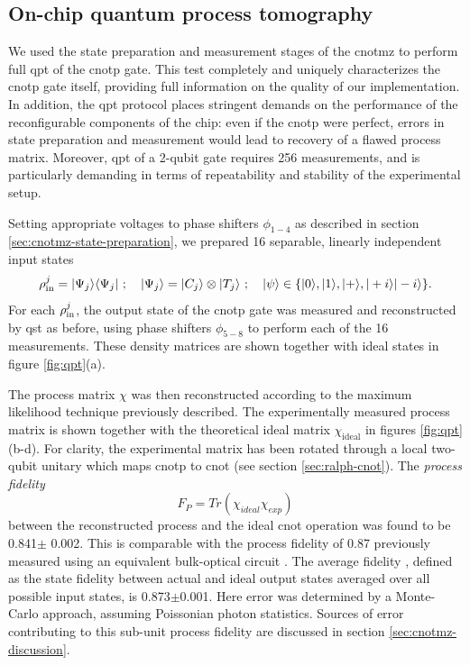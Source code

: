 \subsection{On-chip quantum process tomography}
\label{sec:expt-process-tomo}
We used the state preparation and measurement stages of the \gls{cnotmz} to perform full \gls{qpt} of the \gls{cnotp} gate. This test completely and uniquely characterizes the \gls{cnotp} gate itself, providing full information on the quality of our implementation. In addition, the \gls{qpt} protocol places stringent demands on the performance of the reconfigurable components of the chip: even if the \gls{cnotp} were perfect, errors in state preparation and measurement would lead to recovery of a flawed process matrix. Moreover, \gls{qpt} of a 2-qubit gate requires 256 measurements, and is particularly demanding in terms of repeatability and stability of the experimental setup.

Setting appropriate voltages to phase shifters $\phi_{1-4}$ as described in section \ref{sec:cnotmz-state-preparation}, we prepared 16 separable, linearly independent input states 
\begin{equation}
\rho^j_{\mathrm{in}} = \mbox{$ | \Psi_j \rangle $}{\mbox{$ \langle \Psi_j | $}}~ ; \quad
\mbox{$ | \Psi_j \rangle $}=\mbox{$ | C_j \rangle $}\otimes \mbox{$ | T_j \rangle $}~ ; \quad
\mbox{$ | \psi \rangle $} \in \{\mbox{$ | 0 \rangle $}, \mbox{$ | 1 \rangle $}, \mbox{$ | + \rangle $}, \mbox{$ | +i \rangle $} \mbox{$ | -i \rangle $} \}.
\end{equation}
For each $\rho^j_{\mathrm{in}}$, the output state of the \acrshort{cnotp} gate was measured and reconstructed by \gls{qst} as before, using phase shifters $\phi_{5-8}$ to perform each of the 16 measurements. These density matrices are shown together with ideal states in figure \ref{fig:qpt}(a).

The process matrix $\chi$ was then reconstructed according to the maximum likelihood technique previously described.
The experimentally measured process matrix is shown together with the theoretical ideal matrix $\chi_\mathrm{ideal}$ in figures \ref{fig:qpt}(b-d). For clarity, the experimental matrix has been rotated through a local two-qubit unitary which maps \gls{cnotp} to \gls{cnot} (see section \ref{sec:ralph-cnot}). The \emph{process fidelity} \cite{Nielsen2004}
\begin{equation}
F_{P} = Tr(\chi_{ideal}\chi_{exp})
\end{equation}
between the reconstructed process and the ideal \gls{cnot} operation was found to be 
0.841$\pm$ 0.002. 
This is comparable with the process fidelity of 0.87 previously measured using an equivalent bulk-optical circuit \cite{OBrien2004}. 
The average fidelity \cite{Gilchrist2009}, defined as the state fidelity between actual and ideal output states averaged over all possible input states, is 0.873$\pm$0.001. 
Here error was determined by a Monte-Carlo approach, assuming Poissonian photon statistics. 
Sources of error contributing to this sub-unit process fidelity are discussed in section \ref{sec:cnotmz-discussion}.

